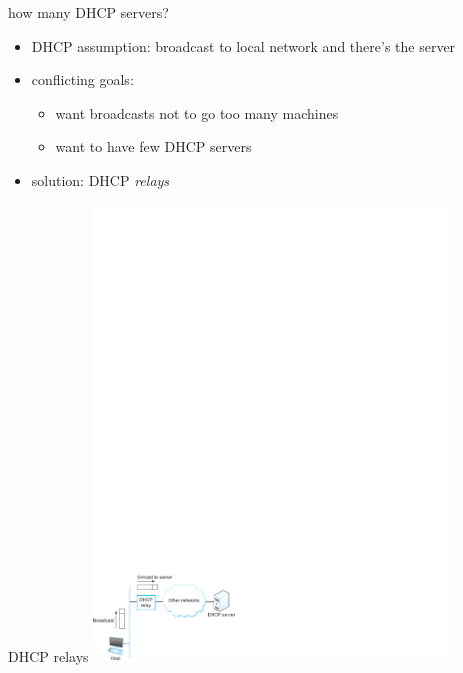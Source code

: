 \begin{frame}{how many DHCP servers?}
    \begin{itemize}
    \item DHCP assumption: broadcast to local network and there's the server
    \vspace{.5cm}
    \item conflicting goals:
        \begin{itemize}
        \item want broadcasts not to go too many machines
        \item want to have few DHCP servers
        \end{itemize}
    \item<2-> solution: DHCP \textit{relays}
    \end{itemize}
\end{frame}

\begin{frame}{DHCP relays}
\includegraphics[width=0.7\textwidth]{../arp/sysapproach-fig80}
\end{frame}
